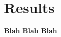 \documentclass[prl,onecolumn,notitlepage,longbibliography,amsmath,floatfix]{revtex4-1}
\begin{document}
\title{}
\author{Kevin}
\date{\today}
\maketitle



%
\section{Results}
{\bf Blah Blah Blah}


%
%
%
%
%
%
\end{document}
